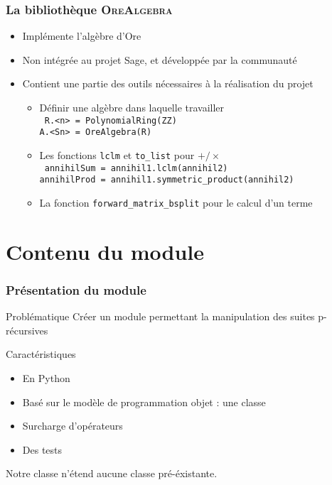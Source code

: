 \documentclass{beamer}
\begin{document}
\begin{frame}
\frametitle{La bibliothèque \textsc{OreAlgebra}}
\begin{center}
\begin{itemize}
    \item Implémente l'algèbre d'Ore
    \item Non intégrée au projet Sage, et développée par la communauté
    \item Contient une partie des outils nécessaires à la réalisation du projet
        \begin{itemize}
            \item Définir une algèbre dans laquelle travailler\\
                \texttt{
                    R.<n> = PolynomialRing(ZZ)\\
                    \hspace{1.3ex}A.<Sn> = OreAlgebra(R)
                }
            \item Les fonctions \texttt{lclm} et \texttt{to\_list} pour $+/\times$\\
                \texttt{
                    annihilSum = annihil1.lclm(annihil2)\\
                    \hspace{1.3ex}annihilProd = annihil1.symmetric\_product(annihil2)
                }
            \item La fonction \texttt{forward\_matrix\_bsplit} pour le calcul d'un terme
    \end{itemize}
\end{itemize}
\end{center}
\end{frame}

\section{Contenu du module}%

\begin{frame}
\frametitle{Présentation du module}
\begin{center}
\begin{alertblock}{Problématique}
    Créer un module permettant la manipulation des suites p-récursives
\end{alertblock}
\vspace{0.6cm}
\begin{block}{Caractéristiques}
    \begin{itemize}
        \item {\small En Python}
        \item Basé sur le modèle de programmation objet : une classe
        \item Surcharge d'opérateurs
        \item Des tests
    \end{itemize}
\end{block}
\vspace{0.6cm}
Notre classe n'étend aucune classe pré-éxistante.
\end{center}
\end{frame}
\end{document}

